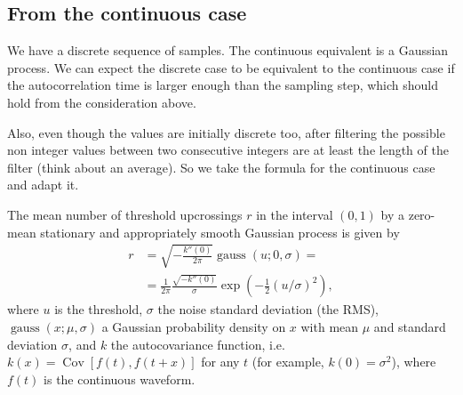 \subsection{From the continuous case}

We have a discrete sequence of samples. The continuous equivalent is a Gaussian
process. We can expect the discrete case to be equivalent to the continuous
case if the autocorrelation time is larger enough than the sampling step, which
should hold from the consideration above.

Also, even though the values are initially discrete too, after filtering the
possible non integer values between two consecutive integers are at least the
length of the filter (think about an average). So we take the formula for the
continuous case and adapt it.

The mean number of threshold upcrossings $r$ in the interval $(0,1)$ by a
zero-mean stationary and appropriately smooth Gaussian process is given by
\cite[81]{rasmussen2006}
%
\begin{align}
    r &= \sqrt{-\frac{k''(0)}{2\pi}} \operatorname{gauss}(u;0,\sigma) = \\
      &= \frac 1 {2\pi} \frac {\sqrt{-k''(0)}} \sigma
         \exp \left( -\frac12 (u/\sigma)^2 \right),
\end{align}
%
where $u$ is the threshold, $\sigma$ the noise standard deviation (the RMS),
$\operatorname{gauss}(x;\mu,\sigma)$ a Gaussian probability density on $x$ with
mean $\mu$ and standard deviation $\sigma$, and $k$ the autocovariance
function, i.e.\ $k(x) = \operatorname{Cov}[f(t), f(t+x)]$ for any $t$ (for
example, $k(0) = \sigma^2$), where $f(t)$ is the continuous waveform.


